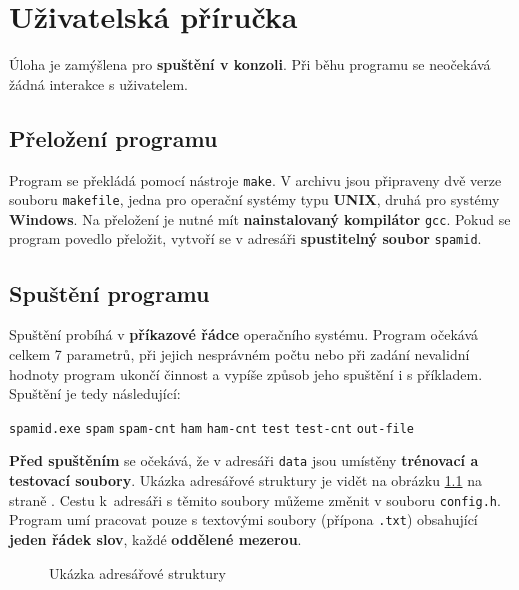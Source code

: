 \documentclass[12pt]{report}
\newcommand\la{\textlangle}  					%
\newcommand\ra{\textrangle}						%
\newcommand\laratexttt[1]{\la\texttt{#1}\ra}	%
\newcommand\indentt[1]{						
	\setlength\parindent{5mm}
	#1
	\setlength\parindent{0mm}
	}											%
\begin{document}
	\chapter{Uživatelská příručka}
	Úloha je zamýšlena pro \textbf{spuštění v konzoli}. Při běhu programu se neočekává žádná interakce s uživatelem.
	
	\section{Přeložení programu}
	Program se překládá pomocí nástroje \texttt{make}. V archivu jsou připraveny dvě verze souboru \texttt{makefile}, jedna pro operační systémy typu \textbf{UNIX}, druhá pro systémy \textbf{Windows}. Na přeložení je nutné mít \textbf{nainstalovaný kompilátor} \texttt{gcc}. Pokud se program povedlo přeložit, vytvoří se v adresáři \textbf{spustitelný soubor} \texttt{spamid}.
		
	\section{Spuštění programu}
	Spuštění probíhá v \textbf{příkazové řádce} operačního systému. Program očekává celkem 7 parametrů, při jejich nesprávném počtu nebo při zadání nevalidní hodnoty program ukončí činnost a vypíše způsob jeho spuštění i s příkladem. Spuštění je tedy následující:
	
	\indentt{\texttt{spamid.exe} \laratexttt{spam} \laratexttt{spam-cnt} \laratexttt{ham} \laratexttt{ham-cnt} \laratexttt{test} \laratexttt{test-cnt} \laratexttt{out-file}$\,$\keys{\return}}
	
	\textbf{Před spuštěním} se očekává, že v adresáři \texttt{data} jsou umístěny \textbf{trénovací a testovací soubory}. Ukázka adresářové struktury je vidět na obrázku \ref{fig:struktura} na straně \pageref{fig:struktura}. Cestu k~adresáři s těmito soubory můžeme změnit v souboru \texttt{config.h}. Program umí pracovat pouze s textovými soubory (přípona \texttt{.txt}) obsahující \textbf{jeden řádek slov}, každé \textbf{oddělené mezerou}.
	
	\begin{figure}
		\centering
		\begin{minipage}{40mm}
		\end{minipage}
		\caption{Ukázka adresářové struktury}
		\label{fig:struktura}
	\end{figure}
	
\end{document}
